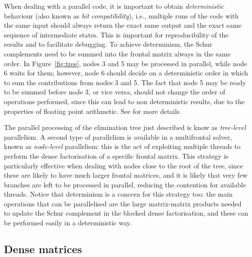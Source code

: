\documentclass[a4paper]{article}
\newcommand{\0}{\mathbf 0}
\begin{document}
When dealing with a parallel code, it is important to obtain {\it deterministic} behaviour (also known as {\it bit compatibility}), i.e., multiple runs of the code with the same input should always return the exact same output and the exact same sequence of intermediate states. This is important for reproducibility of the results and to facilitate debugging. To achieve determinism, the Schur complements need to be summed into the frontal matrix always in the same order. In Figure~\ref{fig:tree}, nodes 3 and 5 may be processed in parallel, while node 6 waits for them; however, node 6 should decide on a deterministic order in which to sum the contributions from nodes 3 and 5. The fact that node 5 may be ready to be summed before node 3, or vice versa, should not change the order of operations performed, since this can lead to non deterministic results, due to the properties of floating point arithmetic. See \cite{HogSco:report} for more details.

The parallel processing of the elimination tree just described is know as {\it tree-level} parallelism. A second type of parallelism is available in a multifrontal solver, known as {\it node-level} parallelism: this is the act of exploiting multiple threads to perform the dense factorisation of a specific frontal matrix. This strategy is particularly effective when dealing with nodes close to the root of the tree, since these are likely to have much larger frontal matrices, and it is likely that very few branches are left to be processed in parallel, reducing the contention for available threads. Notice that determinism is a concern for this strategy too: the main operations that can be parallelised are the large matrix-matrix products needed to update the Schur complement in the blocked dense factorisation, and these can be performed easily in a deterministic way.

\subsection{Dense matrices}
\end{document}
